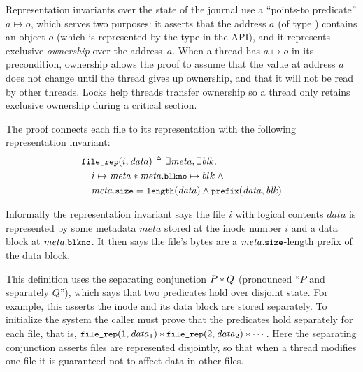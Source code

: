 
Representation invariants over the state of the journal use a
``points-to predicate'' $a \mapsto o$, which serves two purposes: it asserts
that the address $a$ (of type ) contains an object $o$ (which is
represented by the  type in the API), and it represents exclusive
\emph{ownership} over the address~$a$. When a thread has $a \mapsto o$ in its
precondition, ownership allows the proof to assume that the value at address $a$
does not change until the thread gives up ownership, and that it will not be
read by other threads.  Locks help threads transfer ownership so a thread only
retains exclusive ownership during a critical section.

The \simplenfs proof connects each file to its representation with the following
representation invariant:
%
\begin{align*}
  &\cc{file_rep}(i, \mathit{data}) \defeq \exists \mathit{meta}, \exists \mathit{blk}, \\
  &\quad i \mapsto \mathit{meta} \sep \mathit{meta}.\cc{blkno} \mapsto blk \land \phantom{} \\
  &\quad \mathit{meta}.\cc{size} = \cc{length}(\mathit{data}) \land \cc{prefix}(\mathit{data}, \mathit{blk})
\end{align*}

Informally the representation invariant says the file $i$ with logical contents $\mathit{data}$ is represented by some
metadata $\mathit{meta}$ stored at the inode number $i$ and a data block at
$\mathit{meta}.\cc{blkno}$. It then says the file's bytes are a
$\mathit{meta}.\cc{size}$-length prefix of the data block.

This definition uses the separating conjunction $P * Q$ (pronounced ``$P$ and
separately $Q$''), which says that two predicates hold over disjoint state.
For example, this asserts the inode and its data block are stored
separately. To initialize the system the caller must prove that the
 predicates hold separately for each file, that is,
$\cc{file_rep}(1, \mathit{data}_1) \sep \cc{file_rep}(2, \mathit{data}_2) \sep \cdots$. Here the
separating conjunction asserts files are represented disjointly, so that when a
thread modifies one file it is guaranteed not to affect data in other files.


